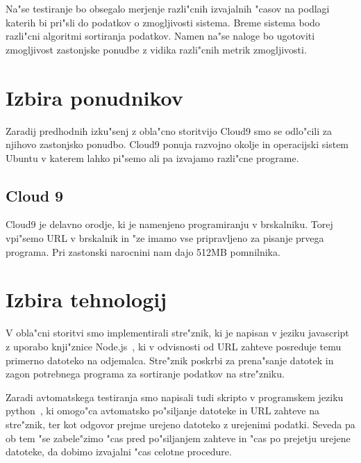 Na"se testiranje bo obsegalo merjenje razli"cnih izvajalnih "casov na podlagi katerih bi pri"sli do podatkov o zmogljivosti sistema. Breme sistema bodo razli"cni algoritmi sortiranja podatkov. Namen na"se naloge bo ugotoviti zmogljivost zastonjske ponudbe z vidika razli"cnih metrik zmogljivosti.


\section{Izbira ponudnikov}
Zaradij predhodnih izku"senj z obla"cno storitvijo Cloud9 smo se odlo"cili za njihovo zastonjsko ponudbo. Cloud9 ponuja razvojno okolje in operacijski sistem Ubuntu v katerem lahko pi"semo ali pa izvajamo razli"cne programe.

\subsection{Cloud 9}
Cloud9 je delavno orodje, ki je namenjeno programiranju v brskalniku. Torej vpi"semo URL v brskalnik in "ze imamo vse pripravljeno za pisanje prvega programa. Pri zastonski narocnini nam dajo 512MB pomnilnika.

\section{Izbira tehnologij}
V obla"cni storitvi smo implementirali stre"znik, ki je napisan v jeziku javascript z uporabo knji"znice Node.js~\cite{8_nodejs}, ki v odvisnosti od URL zahteve posreduje temu primerno datoteko na odjemalca. Stre"znik poskrbi za prena"sanje datotek in zagon potrebnega programa za sortiranje podatkov na stre"zniku.

Zaradi avtomatskega testiranja smo napisali tudi skripto v programskem jeziku python~\cite{8_python}, ki omogo"ca avtomatsko po"siljanje datoteke in URL zahteve na stre"znik, ter kot odgovor prejme urejeno datoteko z urejenimi podatki. Seveda pa ob tem "se zabele"zimo "cas pred po"siljanjem zahteve in "cas po prejetju urejene datoteke, da dobimo izvajalni "cas celotne procedure.
